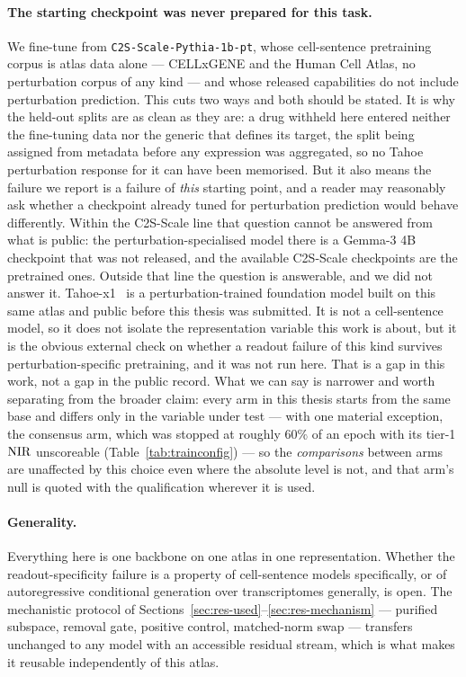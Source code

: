 \paragraph{The starting checkpoint was never prepared for this task.} We fine-tune from
\texttt{C2S-Scale-Pythia-1b-pt}, whose cell-sentence pretraining corpus is atlas data alone ---
CELLxGENE and the Human Cell Atlas, no perturbation corpus of any kind --- and whose released
capabilities do not include perturbation prediction. This cuts two ways and both should be stated. It
is why the held-out splits are as clean as they are: a drug withheld here entered neither the
fine-tuning data nor the generic that defines its target, the split being assigned from metadata
before any expression was aggregated, so no Tahoe perturbation response for it can have been
memorised. But it also means the failure we report is a failure of \emph{this} starting point, and
a reader may reasonably ask whether a checkpoint already tuned for perturbation prediction would
behave differently. Within the C2S-Scale line that question cannot be answered from what is public:
the perturbation-specialised model there is a Gemma-3 4B checkpoint that was not released, and the
available C2S-Scale checkpoints are the pretrained ones. Outside that line the question is
answerable, and we did not answer it. Tahoe-x1~\cite{tahoex1} is a perturbation-trained foundation
model built on this same atlas and public before this thesis was submitted. It is not a
cell-sentence model, so it does not isolate the representation variable this work is about, but it
is the obvious external check on whether a readout failure of this kind survives
perturbation-specific pretraining, and it was not run here. That is a gap in this work, not a gap
in the public record. What we can say is narrower and worth separating from
the broader claim: every arm in this thesis starts from the same base and differs only in the
variable under test --- with one material exception, the consensus arm, which was stopped at roughly
$60\%$ of an epoch with its tier-1 $\textrm{NIR}$ unscoreable (Table~\ref{tab:trainconfig}) --- so the
\emph{comparisons} between arms are unaffected by this choice even where the absolute level is not,
and that arm's null is quoted with the qualification wherever it is used.

\paragraph{Generality.} Everything here is one backbone on one atlas in one representation. Whether
the readout-specificity failure is a property of cell-sentence models specifically, or of
autoregressive conditional generation over transcriptomes generally, is open. The mechanistic
protocol of Sections~\ref{sec:res-used}--\ref{sec:res-mechanism} --- purified subspace, removal
gate, positive control, matched-norm swap --- transfers unchanged to any model with an accessible
residual stream, which is what makes it reusable independently of this atlas.
